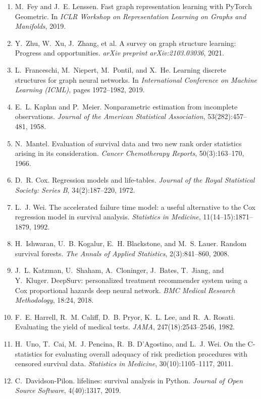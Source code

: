 \documentclass{mnnit}
\begin{document}
\begin{enumerate}
\item\label{ref:pyg} M.~Fey and J.~E. Lenssen. Fast graph representation learning with PyTorch Geometric. In \emph{ICLR Workshop on Representation Learning on Graphs and Manifolds}, 2019.
\item\label{ref:gslsurvey} Y.~Zhu, W.~Xu, J.~Zhang, et al. A survey on graph structure learning: Progress and opportunities. \emph{arXiv preprint arXiv:2103.03036}, 2021.
\item\label{ref:lds} L.~Franceschi, M.~Niepert, M.~Pontil, and X.~He. Learning discrete structures for graph neural networks. In \emph{International Conference on Machine Learning (ICML)}, pages 1972--1982, 2019.
\item\label{ref:km} E.~L. Kaplan and P.~Meier. Nonparametric estimation from incomplete observations. \emph{Journal of the American Statistical Association}, 53(282):457--481, 1958.
\item\label{ref:logrank} N.~Mantel. Evaluation of survival data and two new rank order statistics arising in its consideration. \emph{Cancer Chemotherapy Reports}, 50(3):163--170, 1966.
\item\label{ref:cox} D.~R. Cox. Regression models and life-tables. \emph{Journal of the Royal Statistical Society: Series B}, 34(2):187--220, 1972.
\item\label{ref:aft} L.~J. Wei. The accelerated failure time model: a useful alternative to the Cox regression model in survival analysis. \emph{Statistics in Medicine}, 11(14--15):1871--1879, 1992.
\item\label{ref:rsf} H.~Ishwaran, U.~B. Kogalur, E.~H. Blackstone, and M.~S. Lauer. Random survival forests. \emph{The Annals of Applied Statistics}, 2(3):841--860, 2008.
\item\label{ref:deepsurv} J.~L. Katzman, U.~Shaham, A.~Cloninger, J.~Bates, T.~Jiang, and Y.~Kluger. DeepSurv: personalized treatment recommender system using a Cox proportional hazards deep neural network. \emph{BMC Medical Research Methodology}, 18:24, 2018.
\item\label{ref:harrell} F.~E. Harrell, R.~M. Califf, D.~B. Pryor, K.~L. Lee, and R.~A. Rosati. Evaluating the yield of medical tests. \emph{JAMA}, 247(18):2543--2546, 1982.
\item\label{ref:uno} H.~Uno, T.~Cai, M.~J. Pencina, R.~B. D'Agostino, and L.~J. Wei. On the C-statistics for evaluating overall adequacy of risk prediction procedures with censored survival data. \emph{Statistics in Medicine}, 30(10):1105--1117, 2011.
\item\label{ref:lifelines} C.~Davidson-Pilon. lifelines: survival analysis in Python. \emph{Journal of Open Source Software}, 4(40):1317, 2019.

\end{enumerate}
\end{document}

